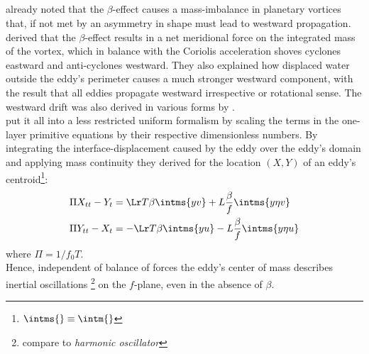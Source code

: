 \subsection{\cite{Cushman-Roisin1990}}\label{sec:hist_cush}
\citet{Bjerknes1944} already noted that the $\beta$-effect causes a mass-imbalance in planetary vortices that, if not met by an asymmetry in shape must lead to westward propagation. \citet{Nof1981} derived that the $\beta$-effect results in a net meridional force on the integrated mass of the vortex, which in balance with the Coriolis acceleration shoves cyclones eastward and anti-cyclones westward. They also explained how displaced water outside the eddy's perimeter causes a much stronger westward component, with the result that all eddies propagate westward irrespective or rotational sense. The westward drift was also derived in various forms by
\eg \citet{flierl1984rossby,matsuura1982evolution}. \\
\citet{Cushman-Roisin1990} put it all into a less restricted uniform formalism by scaling the terms in the one-layer primitive equations by their respective dimensionless numbers. By integrating the interface-displacement caused by the eddy over the eddy's domain and applying mass continuity they derived for the location $(X,Y)$ of an eddy's centroid\footnote{$\intms{}\equiv \intm{}$}:
\begin{equation}\begin{split}
	\Pi X_{tt} - Y_t
	&=
	\Lr T \beta     \intms{yv}
	+
	L\frac{  \beta  }{ f   } \intms{y\eta v}\\
	\Pi Y_{tt} - X_t
	&=
	-\Lr T \beta   \intms{yu}
	-
	L\frac{  \beta  }{ f   }  \intms{y\eta u} 	  \label{eq:cush1}
\end{split}\end{equation}
where $\Pi=1/f_0T$.\\
 Hence, independent of balance of forces the eddy's center of mass describes inertial oscillations \footnote{compare to \textit{harmonic oscillator}} on the $f$-plane, even in the absence of $\beta$.
